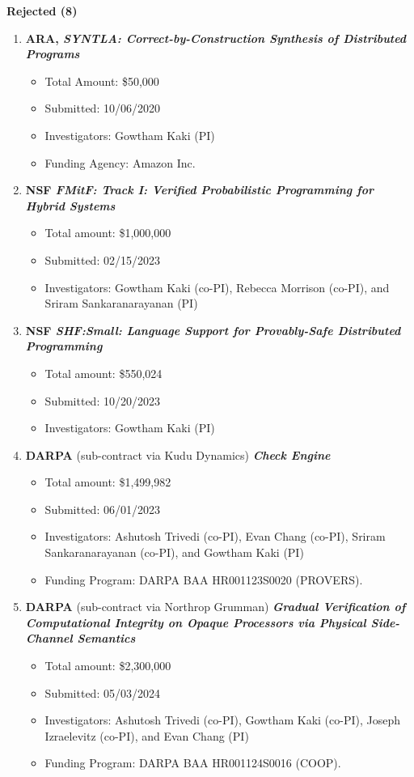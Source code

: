 \documentclass{article}
\begin{document}
\noindent\textbf{Rejected (8)}
\begin{enumerate}
\item {\bf ARA, \emph{SYNTLA: Correct-by-Construction Synthesis of Distributed Programs}}
  \begin{itemize}
    \item 
      Total Amount: \$50,000
    \item 
      Submitted: 10/06/2020
    \item 
      Investigators: Gowtham Kaki (PI)
    \item 
      Funding Agency: Amazon Inc.
  \end{itemize}


\item {\bf NSF \emph{FMitF: Track I: Verified Probabilistic Programming for Hybrid Systems}} 
  \begin{itemize}
  \item
    Total amount: \$1,000,000
  \item 
    Submitted: 02/15/2023
  \item Investigators: Gowtham Kaki (co-PI), Rebecca Morrison (co-PI), and
  Sriram Sankaranarayanan (PI)
  \end{itemize}

\item {\bf NSF \emph{SHF:Small: Language Support for Provably-Safe Distributed Programming}} 
  \begin{itemize}
  \item
    Total amount: \$550,024
  \item  
    Submitted: 10/20/2023 
  \item 
    Investigators: Gowtham Kaki (PI)  
  \end{itemize}

\item {\bf DARPA} (sub-contract via Kudu Dynamics) {\bf\emph{Check Engine}} 
  \begin{itemize}
  \item
    Total amount: \$1,499,982
  \item  
    Submitted: 06/01/2023 
  \item 
    Investigators: Ashutosh Trivedi (co-PI), Evan Chang (co-PI), Sriram
    Sankaranarayanan (co-PI), and Gowtham Kaki (PI)
  \item 
      Funding Program: DARPA BAA HR001123S0020 (PROVERS).  
  \end{itemize}

\item {\bf DARPA} (sub-contract via Northrop Grumman) {\bf\emph{Gradual Verification of Computational Integrity on Opaque Processors via Physical Side-Channel Semantics}} 
  \begin{itemize}
  \item
    Total amount: \$2,300,000
  \item  
    Submitted: 05/03/2024 
  \item 
    Investigators: Ashutosh Trivedi (co-PI), Gowtham Kaki (co-PI), Joseph
    Izraelevitz (co-PI), and Evan Chang (PI)
  \item 
      Funding Program: DARPA BAA HR001124S0016 (COOP).  
  \end{itemize}  
  

\end{enumerate}
\end{document}
